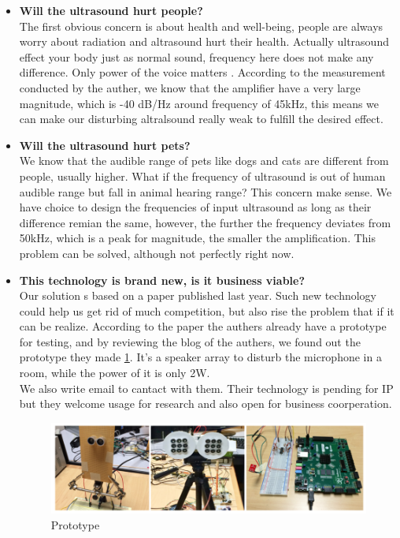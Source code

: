 \documentclass[12pt,twoside]{article}
\begin{document}
\begin{itemize}
\item \textbf{Will the ultrasound hurt people?}\\ The first obvious concern is about health and well-being, people are always worry about radiation and altrasound 
hurt their health. Actually ultrasound effect your body just as normal sound, frequency here does not make any difference. Only power of the voice matters 
\cite{ultrasoundfda}. According to the measurement conducted by the auther\cite{RoyNirupam2017BMMH}, we know that the amplifier have a very large magnitude, which is 
-40 dB/Hz around frequency of 45kHz, this means we can make our disturbing altralsound really weak to fulfill the desired effect.
\item \textbf{Will the ultrasound hurt pets?}\\ We know that the audible range of pets like dogs and cats are different from people, usually higher. What if the 
frequency of ultrasound is out of human audible range but fall in animal hearing range? This concern make sense. We have choice to design the frequencies of input 
ultrasound as long as their difference remian the same, however, the further the frequency deviates from 50kHz, which is a peak for magnitude, the smaller the 
amplification. This problem can be solved, although not perfectly right now.
\item \textbf{This technology is brand new, is it business viable?}\\ Our solution s based on a paper published last year. Such new technology could help us get rid 
of much competition, but also rise the problem that if it can be realize. According to the paper the authers already have a prototype for testing, and by reviewing 
the blog of the authers, we found out the prototype they made \ref{fig:Prototype}. It's a speaker array to disturb the microphone in a room, while the power of it is 
only 2W. \\
We also write email to cantact with them. Their technology is pending for IP but they welcome usage for research and also open for business coorperation.

\begin{figure}[!htb]
\centering
\includegraphics[width=\textwidth]{prototype.png}
\caption{Prototype}
\label{fig:Prototype}
\end{figure}

\end{itemize}
\end{document}
